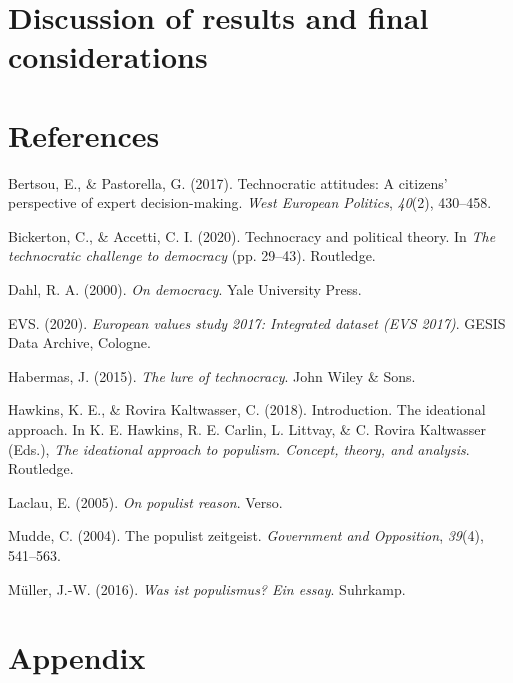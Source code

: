 \documentclass[
  12pt,
  english,
]{article}
\newlength{\cslhangindent}
\newlength{\cslentryspacingunit} %
\newenvironment{CSLReferences}[2] %
 {%
  \setlength{\parindent}{0pt}
  \ifodd #1
  \let\oldpar\par
  \def\par{\hangindent=\cslhangindent\oldpar}
  \fi
  \setlength{\parskip}{#2\cslentryspacingunit}
 }%
 {}
\begin{document}
\hypertarget{discussion-of-results-and-final-considerations}{%
\section{Discussion of results and final
considerations}\label{discussion-of-results-and-final-considerations}}

\newpage{}

\hypertarget{references}{%
\section{References}\label{references}}

\hypertarget{refs}{}
\begin{CSLReferences}{1}{0}
\leavevmode{}%
Bertsou, E., \& Pastorella, G. (2017). Technocratic attitudes: A
citizens' perspective of expert decision-making. \emph{West European
Politics}, \emph{40}(2), 430--458.

\leavevmode{}%
Bickerton, C., \& Accetti, C. I. (2020). Technocracy and political
theory. In \emph{The technocratic challenge to democracy} (pp. 29--43).
Routledge.

\leavevmode{}%
Dahl, R. A. (2000). \emph{On democracy}. Yale University Press.

\leavevmode{}%
EVS. (2020). \emph{European values study 2017: Integrated dataset (EVS
2017)}. GESIS Data Archive, Cologne.

\leavevmode{}%
Habermas, J. (2015). \emph{The lure of technocracy}. John Wiley \& Sons.

\leavevmode{}%
Hawkins, K. E., \& Rovira Kaltwasser, C. (2018). Introduction. The
ideational approach. In K. E. Hawkins, R. E. Carlin, L. Littvay, \& C.
Rovira Kaltwasser (Eds.), \emph{The ideational approach to populism.
Concept, theory, and analysis}. Routledge.

\leavevmode{}%
Laclau, E. (2005). \emph{On populist reason}. Verso.

\leavevmode{}%
Mudde, C. (2004). The populist zeitgeist. \emph{Government and
Opposition}, \emph{39}(4), 541--563.

\leavevmode{}%
Müller, J.-W. (2016). \emph{Was ist populismus? Ein essay}. Suhrkamp.

\end{CSLReferences}

\newpage{}

\hypertarget{appendix}{%
\section{Appendix}\label{appendix}}
\end{document}
